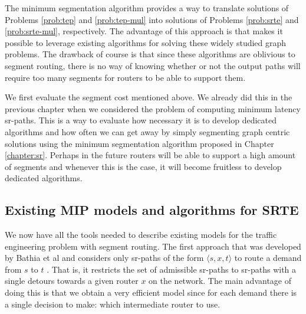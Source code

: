 The minimum segmentation algorithm provides a way to translate solutions of Problems \ref{prob:tep} and \ref{prob:tep-mul}
into solutions of Problems \ref{prob:srte} and \ref{prob:srte-mul}, respectively. The advantage of this approach is that
makes it possible to leverage existing algorithms for solving these widely studied graph problems. The drawback of course
is that since these algorithms are oblivious to segment routing, there is no way of knowing whether or not the output paths will
require too many segments for routers to be able to support them.

We first evaluate the segment cost mentioned above. 
We already did this in the previous chapter when we considered the problem of computing minimum latency sr-paths.
This is a way to evaluate how necessary it is to develop dedicated algorithms and how often we can get away by
simply segmenting graph centric solutions using the minimum segmentation algorithm proposed in Chapter \ref{chapter:sr}.
Perhaps in the future routers will be able to support a high amount of segments
and whenever this is the case, it will become fruitless to develop dedicated algorithms.

% 


\subsection{Existing MIP models and algorithms for SRTE}

We now have all the tools needed to describe existing models for the traffic engineering problem with segment routing.
The first approach that was developed by Bathia et al and considers only sr-paths of the form $\langle s, x, t \rangle$ to route a demand from
$s$ to $t$ \cite{bhatia}. That is, it restricts the set of admissible sr-paths to sr-paths with a single detours towards a given
router $x$ on the network. The main advantage of doing this is that we obtain a very efficient model since for each demand 
there is a single decision to make: which intermediate router to use.

